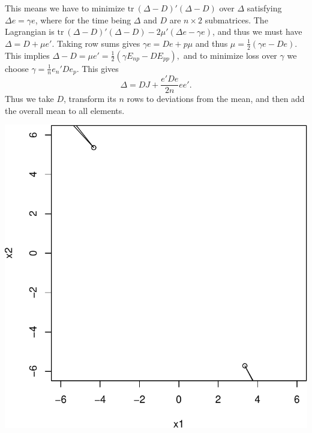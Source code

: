 \documentclass[
  12pt,
  letterpaper,
  DIV=11,
  numbers=noendperiod]{scrreprt}
\theoremstyle{remark}
\begin{document}
This means we have to minimize \(\text{tr}\ (\Delta-D)'(\Delta-D)\) over
\(\Delta\) satisfying \(\Delta e=\gamma e\), where for the time being
\(\Delta\) and \(D\) are \(n\times 2\) submatrices. The Lagrangian is
\(\text{tr}\ (\Delta-D)'(\Delta-D)-2\mu'(\Delta e-\gamma e)\), and thus
we must have \(\Delta=D+\mu e'\). Taking row sums gives
\(\gamma e = De+p\mu\) and thus \(\mu = \frac12(\gamma e-De)\). This
implies \(\Delta-D=\mu e'=\frac{1}{2}(\gamma E_{np}-DE_{pp}),\) and to
minimize loss over \(\gamma\) we choose \(\gamma=\frac{1}{n}e_n'De_p\).
This gives \[
\Delta=DJ+\frac{e'De}{2n}ee'.
\] Thus we take \(D\), transform its \(n\) rows to deviations from the
mean, and then add the overall mean to all elements.

\begin{center}
\includegraphics{constrained_files/figure-pdf/plpnts-1.pdf}
\end{center}
\end{document}
